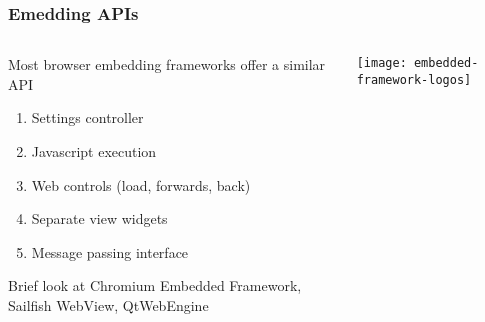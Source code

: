\documentclass[
	notes=none,
	aspectratio=169
]{beamer}
\begin{document}
\begin{frame}
\frametitle{Emedding APIs}

\begin{columns}[T]
\begin{column}[T]{0.73\textwidth}
\setlength{\parskip}{0.5em}

\vspace{1.0cm}
Most browser embedding frameworks offer a similar API
\begin{enumerate}
\setlength{\parskip}{0.5em}
\item Settings controller
\item Javascript execution
\item Web controls (load, forwards, back)
\item Separate view widgets
\item Message passing interface
\end{enumerate}
Brief look at Chromium Embedded Framework, Sailfish WebView, QtWebEngine
\end{column}
\begin{column}[T]{0.2\textwidth}
\setlength{\parskip}{0.5em}

\vspace{0.5cm}
\hspace{-1.0cm}
\texttt{[image: embedded-framework-logos]}

\end{column}
\end{columns}

\end{frame}
\note{
\begin{enumerate}
\item -
\end{enumerate}
}

\end{document}
